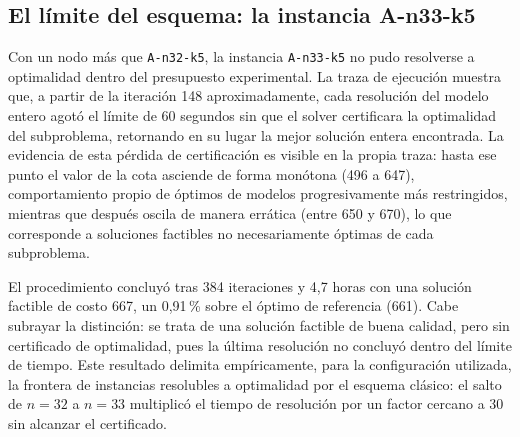 \subsection{El límite del esquema: la instancia A-n33-k5}
\label{sec:limite}

Con un nodo más que \texttt{A-n32-k5}, la instancia \texttt{A-n33-k5} no pudo
resolverse a optimalidad dentro del presupuesto experimental. La traza de
ejecución muestra que, a partir de la iteración 148 aproximadamente, cada
resolución del modelo entero agotó el límite de 60 segundos sin que el solver
certificara la optimalidad del subproblema, retornando en su lugar la mejor
solución entera encontrada. La evidencia de esta pérdida de certificación es
visible en la propia traza: hasta ese punto el valor de la cota asciende de
forma monótona (496 a 647), comportamiento propio de óptimos de modelos
progresivamente más restringidos, mientras que después oscila de manera
errática (entre 650 y 670), lo que corresponde a soluciones factibles no
necesariamente óptimas de cada subproblema.

El procedimiento concluyó tras 384 iteraciones y 4{,}7 horas con una solución
factible de costo 667, un 0{,}91\,\% sobre el óptimo de referencia (661). Cabe
subrayar la distinción: se trata de una solución factible de buena calidad,
pero sin certificado de optimalidad, pues la última resolución no concluyó
dentro del límite de tiempo. Este resultado delimita empíricamente, para la
configuración utilizada, la frontera de instancias resolubles a optimalidad
por el esquema clásico: el salto de $n=32$ a $n=33$ multiplicó el tiempo de
resolución por un factor cercano a 30 sin alcanzar el certificado.
